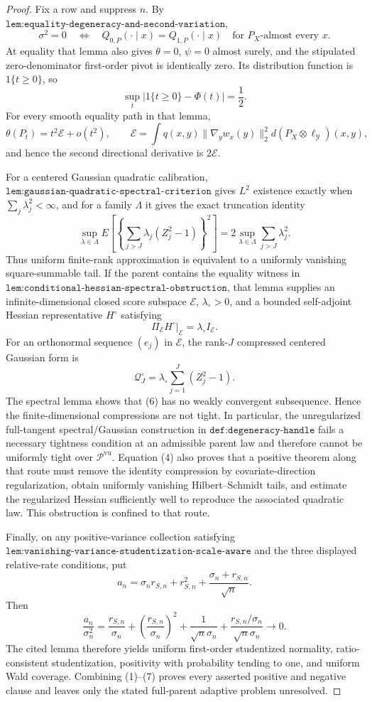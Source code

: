 \documentclass{article}
\begin{document}
\begin{proof}
Fix a row and suppress \(n\). By \(\texttt{lem:equality-degeneracy-and-second-variation}\),
\[\sigma^2=0\quad\Longleftrightarrow\quad Q_{0,P}(\cdot\mid x)=Q_{1,P}(\cdot\mid x)\quad\text{for }P_X\text{-almost every }x.\tag{1}\]
At equality that lemma also gives \(\theta=0\), \(\psi=0\) almost surely, and the stipulated zero-denominator first-order pivot is identically zero. Its distribution function is \(1\{t\ge0\}\), so
\[\sup_t|1\{t\ge0\}-\Phi(t)|=\frac12.\tag{2}\]
For every smooth equality path in that lemma,
\[\theta(P_t)=t^2\mathcal E+o(t^2),\qquad \mathcal E=\int q(x,y)\lVert\nabla_yw_x(y)\rVert_2^2d(P_X\otimes\ell_{\mathcal Y})(x,y),\tag{3}\]
and hence the second directional derivative is \(2\mathcal E\).

For a centered Gaussian quadratic calibration, \(\texttt{lem:gaussian-quadratic-spectral-criterion}\) gives \(L^2\) existence exactly when \(\sum_j\lambda_j^2<\infty\), and for a family \(\Lambda\) it gives the exact truncation identity
\[\sup_{\lambda\in\Lambda}E\!\left[\left\{\sum_{j>J}\lambda_j(Z_j^2-1)\right\}^2\right]=2\sup_{\lambda\in\Lambda}\sum_{j>J}\lambda_j^2.\tag{4}\]
Thus uniform finite-rank approximation is equivalent to a uniformly vanishing square-summable tail. If the parent contains the equality witness in \(\texttt{lem:conditional-hessian-spectral-obstruction}\), that lemma supplies an infinite-dimensional closed score subspace \(\mathcal E\), \(\lambda_\circ>0\), and a bounded self-adjoint Hessian representative \(H^\circ\) satisfying
\[\Pi_{\mathcal E}H^\circ|_{\mathcal E}=\lambda_\circ I_{\mathcal E}.\tag{5}\]
For an orthonormal sequence \((e_j)\) in \(\mathcal E\), the rank-\(J\) compressed centered Gaussian form is
\[\mathcal Q_J^\circ=\lambda_\circ\sum_{j=1}^J(Z_j^2-1).\tag{6}\]
The spectral lemma shows that (6) has no weakly convergent subsequence. Hence the finite-dimensional compressions are not tight. In particular, the unregularized full-tangent spectral/Gaussian construction in \(\texttt{def:degeneracy-handle}\) fails a necessary tightness condition at an admissible parent law and therefore cannot be uniformly tight over \(\mathscr P^{\mathrm{vu}}\). Equation (4) also proves that a positive theorem along that route must remove the identity compression by covariate-direction regularization, obtain uniformly vanishing Hilbert--Schmidt tails, and estimate the regularized Hessian sufficiently well to reproduce the associated quadratic law. This obstruction is confined to that route.

Finally, on any positive-variance collection satisfying \(\texttt{lem:vanishing-variance-studentization-scale-aware}\) and the three displayed relative-rate conditions, put
\[a_n=\sigma_nr_{S,n}+r_{S,n}^2+\frac{\sigma_n+r_{S,n}}{\sqrt n}.\]
Then
\[\frac{a_n}{\sigma_n^2}=\frac{r_{S,n}}{\sigma_n}+\left(\frac{r_{S,n}}{\sigma_n}\right)^2+\frac1{\sqrt n\sigma_n}+\frac{r_{S,n}/\sigma_n}{\sqrt n\sigma_n}\longrightarrow0.\tag{7}\]
The cited lemma therefore yields uniform first-order studentized normality, ratio-consistent studentization, positivity with probability tending to one, and uniform Wald coverage. Combining (1)--(7) proves every asserted positive and negative clause and leaves only the stated full-parent adaptive problem unresolved.
\end{proof}
\end{document}
